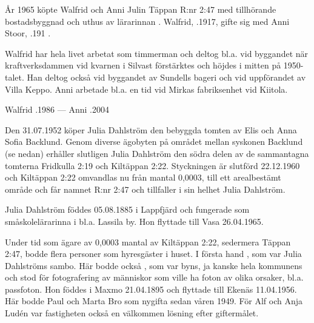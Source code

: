 %

%
År 1965 köpte Walfrid och Anni Julin Täppan R:nr 2:47 med tillhörande bostadsbyggnad och uthus av lärarinnan . Walfrid, .1917, gifte sig med Anni Stoor, .191 .

Walfrid har hela livet arbetat som timmerman och deltog bl.a. vid byggandet när kraftverksdammen vid kvarnen i Silvast förstärktes och höjdes i mitten på 1950-talet. Han deltog också vid byggandet av Sundells bageri och vid uppförandet av Villa Keppo. Anni arbetade bl.a. en tid vid Mirkas fabriksenhet vid Kiitola.

Walfrid .1986  ---  Anni .2004


%


%
Den 31.07.1952 köper Julia Dahlström den bebyggda tomten av Elis och Anna Sofia Backlund. Genom diverse ägobyten på området mellan syskonen Backlund (se nedan) erhåller slutligen Julia Dahlström den södra delen av de sammantagna tomterna Fridkulla 2:19 och Kiltäppan 2:22. Styckningen är slutförd 22.12.1960 och Kiltäppan 2:22 omvandlas nu från mantal 0,0003, till ett arealbestämt område och får namnet  R:nr 2:47 och tillfaller i sin helhet Julia Dahlström.

Julia Dahlström föddes 05.08.1885 i Lappfjärd och fungerade som småskolelärarinna i bl.a. Lassila by. Hon flyttade till Vasa 26.04.1965.


Under  tid som ägare av 0,0003 mantal av Kiltäppan 2:22, sedermera Täppan 2:47, bodde flera personer som hyresgäster i huset. I första hand , som var Julia Dahlströms sambo. Här bodde också , som var byns, ja kanske hela kommunens  och stod för fotografering av människor som ville ha foton av olika orsaker, bl.a. passfoton. Hon föddes i Maxmo 21.04.1895 och flyttade till Ekenäs 11.04.1956. Här bodde Paul och Marta Bro som nygifta sedan våren 1949. För Alf och Anja Ludén var fastigheten också en välkommen lösning efter giftermålet.

